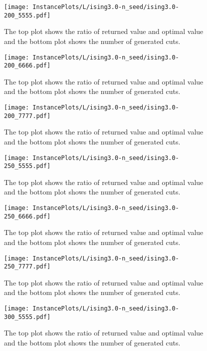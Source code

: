 \documentclass[10pt,a4paper]{article}
\begin{document}
\begin{figure}[H]
\texttt{[image: InstancePlots/L/ising3.0-n\_seed/ising3.0-200\_5555.pdf]}
\caption{The top plot shows the ratio of returned value and optimal value     and the bottom plot shows the number of generated cuts.}
\end{figure}

\begin{figure}[H]
\texttt{[image: InstancePlots/L/ising3.0-n\_seed/ising3.0-200\_6666.pdf]}
\caption{The top plot shows the ratio of returned value and optimal value     and the bottom plot shows the number of generated cuts.}
\end{figure}

\begin{figure}[H]
\texttt{[image: InstancePlots/L/ising3.0-n\_seed/ising3.0-200\_7777.pdf]}
\caption{The top plot shows the ratio of returned value and optimal value     and the bottom plot shows the number of generated cuts.}
\end{figure}

\begin{figure}[H]
\texttt{[image: InstancePlots/L/ising3.0-n\_seed/ising3.0-250\_5555.pdf]}
\caption{The top plot shows the ratio of returned value and optimal value     and the bottom plot shows the number of generated cuts.}
\end{figure}

\begin{figure}[H]
\texttt{[image: InstancePlots/L/ising3.0-n\_seed/ising3.0-250\_6666.pdf]}
\caption{The top plot shows the ratio of returned value and optimal value     and the bottom plot shows the number of generated cuts.}
\end{figure}

\begin{figure}[H]
\texttt{[image: InstancePlots/L/ising3.0-n\_seed/ising3.0-250\_7777.pdf]}
\caption{The top plot shows the ratio of returned value and optimal value     and the bottom plot shows the number of generated cuts.}
\end{figure}

\begin{figure}[H]
\texttt{[image: InstancePlots/L/ising3.0-n\_seed/ising3.0-300\_5555.pdf]}
\caption{The top plot shows the ratio of returned value and optimal value     and the bottom plot shows the number of generated cuts.}
\end{figure}
\end{document}
